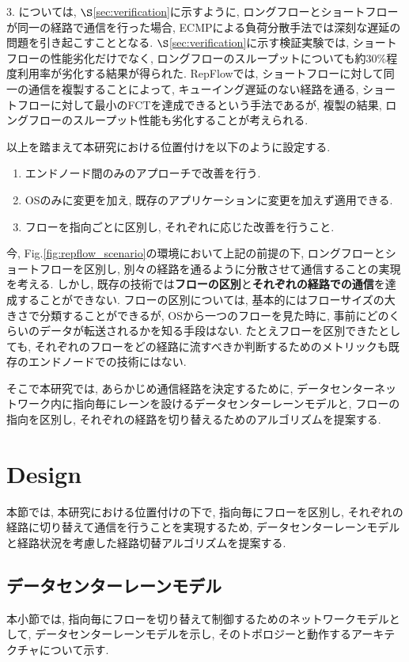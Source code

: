 3. については, $\S$\ref{sec:verification}に示すように, ロングフローとショートフローが同一の経路で通信を行った場合, 
ECMPによる負荷分散手法では深刻な遅延の問題を引き起こすこととなる. 
$\S$\ref{sec:verification}に示す検証実験では, ショートフローの性能劣化だけでなく,
ロングフローのスループットについても約30\%程度利用率が劣化する結果が得られた. 
RepFlowでは, ショートフローに対して同一の通信を複製することによって, キューイング遅延のない経路を通る,
ショートフローに対して最小のFCTを達成できるという手法であるが, 複製の結果, ロングフローのスループット性能も劣化することが考えられる. 

以上を踏まえて本研究における位置付けを以下のように設定する. 
\begin{enumerate}
\item エンドノード間のみのアプローチで改善を行う.  
\item OSのみに変更を加え, 既存のアプリケーションに変更を加えず適用できる. 
\item フローを指向ごとに区別し, それぞれに応じた改善を行うこと. 
\end{enumerate} 

今, Fig.\ref{fig:repflow_scenario}の環境において上記の前提の下, ロングフローとショートフローを区別し, 別々の経路を通るように分散させて通信することの実現を考える. 
しかし, 既存の技術では{\bf フローの区別}と{\bf それぞれの経路での通信}を達成することができない. 
フローの区別については, 基本的にはフローサイズの大きさで分類することができるが, OSから一つのフローを見た時に,
事前にどのくらいのデータが転送されるかを知る手段はない. 
たとえフローを区別できたとしても, それぞれのフローをどの経路に流すべきか判断するためのメトリックも既存のエンドノードでの技術にはない. 

そこで本研究では, あらかじめ通信経路を決定するために, データセンターネットワーク内に指向毎にレーンを設けるデータセンターレーンモデルと,
フローの指向を区別し, それぞれの経路を切り替えるためのアルゴリズムを提案する. 

\section{Design}
本節では, 本研究における位置付けの下で, 指向毎にフローを区別し, それぞれの経路に切り替えて通信を行うことを実現するため,
データセンターレーンモデルと経路状況を考慮した経路切替アルゴリズムを提案する. 

\subsection{データセンターレーンモデル}
\label{subsec:lane_model}
本小節では, 指向毎にフローを切り替えて制御するためのネットワークモデルとして, データセンターレーンモデルを示し,
そのトポロジーと動作するアーキテクチャについて示す. 

